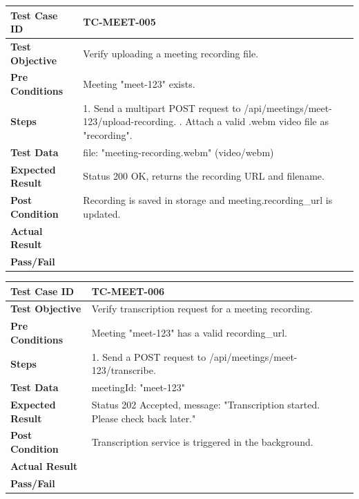 \begin{longtable}{|p{}|p{}|}
\hline
\textbf{Test Case ID} & TC-MEET-005 \\ \hline
\textbf{Test Objective} & Verify uploading a meeting recording file. \\ \hline
\textbf{Pre Conditions} & Meeting "meet-123" exists. \\ \hline
\textbf{Steps} & 
1. Send a multipart POST request to /api/meetings/meet-123/upload-recording. \newline
2. Attach a valid .webm video file as "recording". \\ \hline
\textbf{Test Data} & file: "meeting-recording.webm" (video/webm) \\ \hline
\textbf{Expected Result} & Status 200 OK, returns the recording URL and filename. \\ \hline
\textbf{Post Condition} & Recording is saved in storage and meeting.recording\_url is updated. \\ \hline
\textbf{Actual Result} &  \\ \hline
\textbf{Pass/Fail} &  \\ \hline
\end{longtable}

\begin{longtable}{|p{}|p{}|}
\hline
\textbf{Test Case ID} & TC-MEET-006 \\ \hline
\textbf{Test Objective} & Verify transcription request for a meeting recording. \\ \hline
\textbf{Pre Conditions} & Meeting "meet-123" has a valid recording\_url. \\ \hline
\textbf{Steps} & 
1. Send a POST request to /api/meetings/meet-123/transcribe. \\ \hline
\textbf{Test Data} & meetingId: "meet-123" \\ \hline
\textbf{Expected Result} & Status 202 Accepted, message: "Transcription started. Please check back later." \\ \hline
\textbf{Post Condition} & Transcription service is triggered in the background. \\ \hline
\textbf{Actual Result} &  \\ \hline
\textbf{Pass/Fail} &  \\ \hline
\end{longtable}

